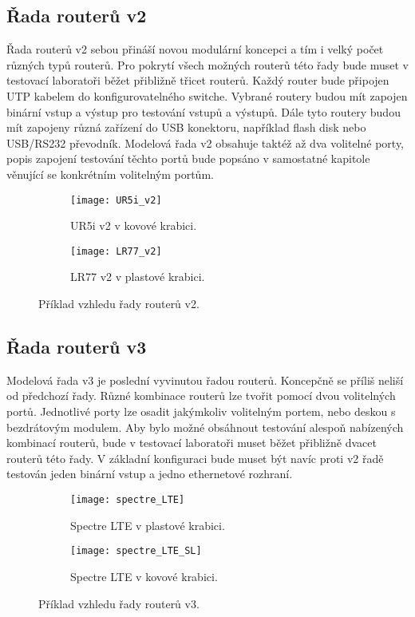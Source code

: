 \subsection{Řada routerů v2}
Řada routerů v2 sebou přináší novou modulární koncepci a tím i velký počet různých typů routerů. Pro pokrytí všech možných routerů této řady bude muset v testovací laboratoři běžet přibližně třicet routerů. Každý router bude připojen UTP kabelem do konfigurovatelného switche. Vybrané routery budou mít zapojen binární vstup a výstup pro testování vstupů a výstupů. Dále tyto routery budou mít zapojeny různá zařízení do USB konektoru, například flash disk nebo USB/RS232 převodník. Modelová řada v2 obsahuje taktéž až dva volitelné porty, popis zapojení testování těchto portů bude popsáno v samostatné kapitole věnující se konkrétním volitelným portům.

\begin{figure}[h]
  \begin{subfigure}[h]{0.5\LW}
    \centering
    \texttt{[image: UR5i\_v2]}
    \caption{UR5i v2 v kovové krabici.}
    \label{fig:UR5i_v2}
  \end{subfigure}
  \begin{subfigure}[h]{0.5\LW}
    \centering
    \texttt{[image: LR77\_v2]}
    \caption{LR77 v2 v plastové krabici.}
    \label{fig:LR77_v2}
  \end{subfigure}
  \caption{Příklad vzhledu řady routerů v2.}
  \label{fig:UR5i_v2}
\end{figure}

\subsection{Řada routerů v3}
Modelová řada v3 je poslední vyvinutou řadou routerů. Koncepčně se příliš neliší od předchozí řady. Různé kombinace routerů lze tvořit pomocí dvou volitelných portů. Jednotlivé porty lze osadit jakýmkoliv volitelným portem, nebo deskou s bezdrátovým modulem. Aby bylo možné obsáhnout testování alespoň nabízených kombinací routerů, bude v testovací laboratoři muset běžet přibližně dvacet routerů této řady. V základní konfiguraci bude muset být navíc proti v2 řadě testován jeden binární vstup a jedno ethernetové rozhraní.

\begin{figure}[h]
  \begin{subfigure}[h]{0.5\LW}
    \centering
    \texttt{[image: spectre\_LTE]}
    \caption{Spectre LTE v plastové krabici.}
    \label{fig:spectre_LTE}
  \end{subfigure}
  \begin{subfigure}[h]{0.5\LW}
    \centering
    \texttt{[image: spectre\_LTE\_SL]}
    \caption{Spectre LTE v kovové krabici.}
    \label{fig:spectre_LTE_SL}
  \end{subfigure}
  \caption{Příklad vzhledu řady routerů v3.}
  \label{fig:spectre_LTE}
\end{figure}

